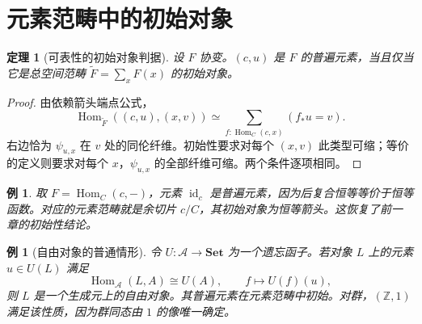 \documentclass[12pt,oneside,openany,fontset=none]{ctexbook}
\theoremstyle{cn}
\newtheorem{example}[definition]{例}
\newtheorem{theorem}[definition]{定理}
\numberwithin{equation}{chapter}
\newcommand{\Set}{\mathbf{Set}}
\newcommand{\id}{\operatorname{id}}
\newcommand{\Hom}{\operatorname{Hom}}
\newcommand{\Z}{\mathbb Z}
\begin{document}
\section{元素范畴中的初始对象}
\begin{theorem}[可表性的初始对象判据]\label{thm:universal-element}
设 $F$ 协变。$(c,u)$ 是 $F$ 的普遍元素，当且仅当它是总空间范畴 $\widetilde F=\sum_xF(x)$ 的初始对象。
\end{theorem}
\begin{proof}
由依赖箭头端点公式，
\[
\Hom_{\widetilde F}((c,u),(x,v))
\simeq\sum_{f:\Hom_C(c,x)}(f_*u=v).
\]
右边恰为 $\psi_{u,x}$ 在 $v$ 处的同伦纤维。初始性要求对每个 $(x,v)$ 此类型可缩；等价的定义则要求对每个 $x$，$\psi_{u,x}$ 的全部纤维可缩。两个条件逐项相同。
\end{proof}
\begin{example}
取 $F=\Hom_C(c,-)$，元素 $\id_c$ 是普遍元素，因为后复合恒等等价于恒等函数。对应的元素范畴就是余切片 $c/C$，其初始对象为恒等箭头。这恢复了前一章的初始性结论。
\end{example}
\begin{example}[自由对象的普通情形]
令 $U:\mathcal A\to\Set$ 为一个遗忘函子。若对象 $L$ 上的元素 $u\in U(L)$ 满足
\[
\Hom_{\mathcal A}(L,A)\cong U(A),
\qquad f\longmapsto U(f)(u),
\]
则 $L$ 是一个生成元上的自由对象。其普遍元素在元素范畴中初始。对群，$(\Z,1)$ 满足该性质，因为群同态由 $1$ 的像唯一确定。
\end{example}
\end{document}
